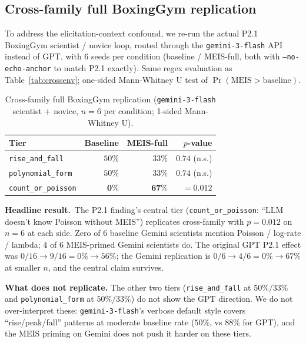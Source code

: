 \documentclass{article}
\begin{document}
\subsection{Cross-family full BoxingGym replication}
\label{sec:crossfamily-full}

To address the elicitation-context confound, we re-run the actual
P2.1 BoxingGym scientist / novice loop, routed through the
\texttt{gemini-3-flash} API instead of GPT, with $6$ seeds per
condition (baseline / MEIS-full, both with \texttt{--no-echo-anchor}
to match P2.1 exactly). Same regex evaluation as
Table~\ref{tab:crossenv}; one-sided Mann-Whitney U test of
$\Pr(\text{MEIS} > \text{baseline})$.

\begin{table}[h]
\centering
\caption{Cross-family full BoxingGym replication
(\texttt{gemini-3-flash} scientist + novice, $n = 6$ per condition;
1-sided Mann-Whitney U).}
\label{tab:crossfamily-full}
\begin{tabular}{lrrr}
\toprule
Tier & Baseline & MEIS-full & $p$-value \\
\midrule
\texttt{rise\_and\_fall}    & $50\%$ & $33\%$ & $0.74$ (n.s.) \\
\texttt{polynomial\_form}   & $50\%$ & $33\%$ & $0.74$ (n.s.) \\
\texttt{count\_or\_poisson} & $\mathbf{0\%}$ & $\mathbf{67\%}$ & $\mathbf{= 0.012}$ \\
\bottomrule
\end{tabular}
\end{table}

\textbf{Headline result.}\ The P2.1 finding's central tier
(\texttt{count\_or\_poisson}: ``LLM doesn't know Poisson without
MEIS'') replicates cross-family with $p = 0.012$ on $n = 6$ at each
side. Zero of $6$ baseline Gemini scientists mention
Poisson / log-rate / lambda; $4$ of $6$ MEIS-primed Gemini
scientists do. The original GPT P2.1 effect was
$0/16 \to 9/16 = 0\% \to 56\%$; the Gemini replication is
$0/6 \to 4/6 = 0\% \to 67\%$ at smaller $n$, and the central claim
survives.

\textbf{What does not replicate.} The other two tiers
(\texttt{rise\_and\_fall} at $50\%/33\%$ and
\texttt{polynomial\_form} at $50\%/33\%$) do not show the GPT
direction. We do not over-interpret these: \texttt{gemini-3-flash}'s
verbose default style covers ``rise/peak/fall'' patterns at
moderate baseline rate ($50\%$, vs $88\%$ for GPT), and the MEIS
priming on Gemini does not push it harder on these tiers.
\end{document}
